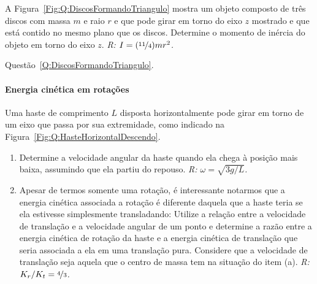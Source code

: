 \begin{question}[type={exam}]
A Figura~\ref{Fig:Q:DiscosFormandoTriangulo} mostra um objeto composto de três discos com massa $m$ e raio $r$ e que pode girar em torno do eixo $z$ mostrado e que está contido no mesmo plano que os discos. Determine o momento de inércia do objeto em torno do eixo $z$. {\it R: $I = (\nicefrac{11}{4}) mr^2$.}
\begin{marginfigure}[-0.5cm]
\centering
{}
\caption{Questão~\ref{Q:DiscosFormandoTriangulo}.\label{Fig:Q:DiscosFormandoTriangulo}}
\end{marginfigure}
\end{question}

\paragraph{Energia cinética em rotações}

\begin{question}[type={exam}]\label{Q:HasteHorizontalDescendo}
Uma haste de comprimento $L$ disposta horizontalmente pode girar em torno de um eixo que passa por sua extremidade, como indicado na Figura~\ref{Fig:Q:HasteHorizontalDescendo}.
\begin{enumerate}[label=(\alph*)]
    \item Determine a velocidade angular da haste quando ela chega à posição mais baixa, assumindo que ela partiu do repouso. {\it R: $\omega = \sqrt{3g/L}$.}
    \item Apesar de termos somente uma rotação, é interessante notarmos que a energia cinética associada a rotação é diferente daquela que a haste teria se ela estivesse simplesmente transladando: Utilize a relação entre a velocidade de translação e a velocidade angular de um ponto e determine a razão entre a energia cinética de rotação da haste e a energia cinética de translação que seria associada a ela em uma translação pura. Considere que a velocidade de translação seja aquela que o centro de massa tem na situação do item (a). {\it R: $K_r/K_t = \nicefrac{4}{3}$.}
\end{enumerate}
\end{question}

